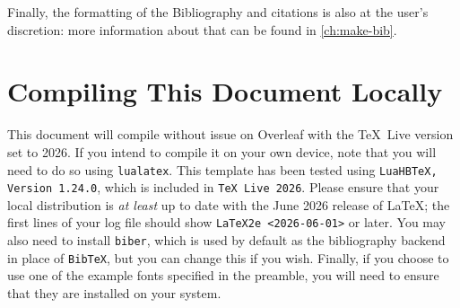 Finally, the formatting of the Bibliography and citations is also at the user's discretion: more information about that can be found in \autoref{ch:make-bib}.

\section{Compiling This Document Locally}
This document will compile without issue on Overleaf with the \TeX\ Live version set to 2026.
If you intend to compile it on your own device, note that you will need to do so using \texttt{lualatex}.
This template has been tested using \texttt{LuaHBTeX, Version 1.24.0}, which is included in \texttt{TeX Live 2026}.
Please ensure that your local distribution is \textit{at least} up to date with the June 2026 release of \LaTeX; the first lines of your log file should show \texttt{LaTeX2e <2026-06-01>} or later.
You may also need to install \texttt{biber}, which is used by default as the bibliography backend in place of \texttt{BibTeX}, but you can change this if you wish.
Finally, if you choose to use one of the example fonts specified in the preamble, you will need to ensure that they are installed on your system.
